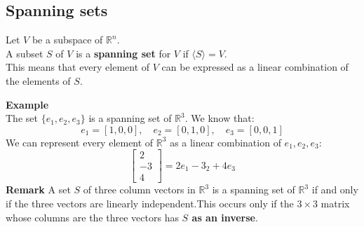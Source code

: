 \documentclass[a4paper, 9pt]{extarticle}
\begin{document}
\subsection{Spanning sets}
\begin{definitionbox}{}{}
  Let $V$ be a subspace of $\mathbb{R}^n$. \\[2ex]
  A subset $S$ of $V$ is a \textbf{spanning set} for $V$ if $\langle S \rangle = V$. \\[2ex]
  This means that every element of $V$ can be expressed as a linear combination of the elements of $S$.
\end{definitionbox}
\noindent\textbf{Example} \\
The set $\{e_1, e_2, e_3\}$ is a spanning set of $\mathbb{R}^3$. We know that:
$$e_1 = [1, 0, 0], \quad e_2 = [0, 1, 0], \quad e_3 = [0, 0, 1]$$
We can represent every element of $\mathbb{R}^3$ as a linear combination of $e_1, e_2, e_3$:
$$
  \begin{bmatrix}
    2  \\
    -3 \\
    4
  \end{bmatrix}
  =
  2e_1 -3_2 + 4e_3
$$
\textbf{Remark} A set $S$ of three column vectors in $\mathbb{R}^3$ is a spanning set of $\mathbb{R}^3$ if and only if the three vectors are linearly independent.This occurs only if the $3 \times 3$ matrix whose columns are the three vectors has \textbf{$S$ as an inverse}.\\[2ex]
\end{document}
